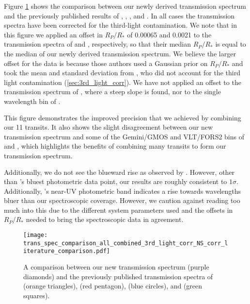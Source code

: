 \documentclass[twocolumn]{aastex63}
\begin{document}
Figure \ref{fig:literature_comparison} shows the comparison between our newly derived transmission spectrum and the previously published results of \protect\cite{Southworth2016}, \protect\cite{Turner2017}, \protect\cite{Lendl2017}, and \protect\cite{Wilson2020}. In all cases the transmission spectra have been corrected for the third-light contamination. We note that in this figure we applied an offset in $R_P/R_*$ of 0.00065 and 0.0021 to the transmission spectra of \cite{Lendl2017} and \cite{Wilson2020}, respectively, so that their median $R_P/R_*$ is equal to the median of our newly derived transmission spectrum. We believe the larger offset for the \cite{Wilson2020} data is because those authors used a Gaussian prior on $R_P/R_*$ and took the mean and standard deviation from \cite{Southworth2015}, who did not account for the third light contamination (\autoref{sec:3rd_light_corr}). We have not applied an offset to the transmission spectrum of \cite{Southworth2016}, where a steep slope is found, nor to the single wavelength bin of \cite{Turner2017}.

This figure demonstrates the improved precision that we achieved by combining our 11 transits. It also shows the slight disagreement between our new transmission spectrum and some of the Gemini/GMOS and VLT/FORS2 bins of \cite{Lendl2017} and \cite{Wilson2020}, which highlights the benefits of combining many transits to form our transmission spectrum. 

Additionally, we do not see the blueward rise as observed by \cite{Southworth2016}. However, other than \cite{Southworth2016}'s bluest photometric data point, our results are roughly consistent to $1\sigma$. Additionally, \cite{Turner2017}'s near-UV photometric band indicates a rise towards wavelengths bluer than our spectroscopic coverage. However, we caution against reading too much into this due to the different system parameters used and the offsets in $R_P/R_*$ needed to bring the spectroscopic data in agreement.

\begin{figure}
    \centering
    \texttt{[image: trans\_spec\_comparison\_all\_combined\_3rd\_light\_corr\_NS\_corr\_literature\_comparison.pdf]}
    \caption{A comparison between our new transmission spectrum (purple diamonds) and the previously published transmission spectra of \protect\cite{Southworth2016} (orange triangles), \protect\cite{Turner2017} (red pentagon), \protect\cite{Lendl2017} (blue circles), and \protect\cite{Wilson2020} (green squares).}
    \label{fig:literature_comparison}
\end{figure}
\end{document}
